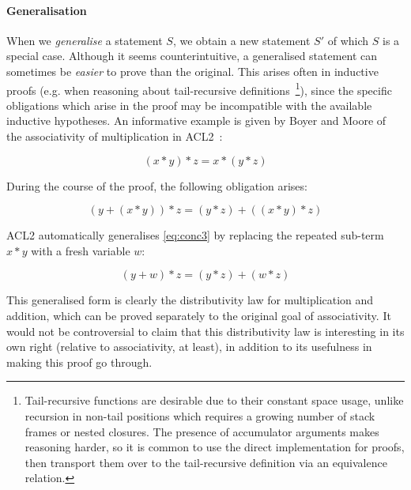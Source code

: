 \paragraph{Generalisation}

\providecommand{\coq}[1]{\lstinline[language=ML]|#1|}

When we \emph{generalise} a statement $S$, we obtain a new statement $S'$ of
which $S$ is a special case. Although it seems counterintuitive, a generalised
statement can sometimes be \emph{easier} to prove than the original. This arises
often in inductive proofs (e.g. when reasoning about tail-recursive
definitions~\cite{kapur2003automatic}\footnote{Tail-recursive functions are
  desirable due to their constant space usage, unlike recursion in non-tail
  positions which requires a growing number of stack frames or nested closures.
  The presence of accumulator arguments makes reasoning harder, so it is common
  to use the direct implementation for proofs, then transport them over to the
  tail-recursive definition via an equivalence relation.}), since the specific
obligations which arise in the proof may be incompatible with the available
inductive hypotheses. An informative example is given by Boyer and Moore of the
associativity of multiplication in \textsc{ACL2}~\cite{boyer1983proof}:

$$(x * y) * z = x * (y * z)$$

During the course of the proof, the following obligation arises:

\begin{equation}
  \tag{conc3}
  (y + (x * y)) * z = (y * z) + ((x * y) * z)
  \label{eq:conc3}
\end{equation}

ACL2 automatically generalises \eqref{eq:conc3} by replacing the repeated
sub-term $x * y$ with a fresh variable $w$:

\begin{equation}
  \tag{conc4}
  (y + w) * z = (y * z) + (w * z)
  \label{eq:conc4}
\end{equation}

This generalised form is clearly the distributivity law for multiplication and
addition, which can be proved separately to the original goal of
associativity. It would not be controversial to claim that this distributivity
law is interesting in its own right (relative to associativity, at least), in
addition to its usefulness in making this proof go through.



